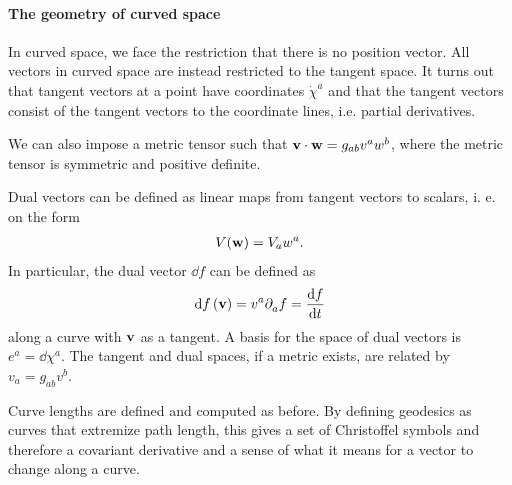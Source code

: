 \paragraph{The geometry of curved space}
In curved space, we face the restriction that there is no position vector. All vectors in curved space are instead restricted to the tangent space. It turns out that tangent vectors at a point have coordinates $\dot{\chi}^{a}$ and that the tangent vectors consist of the tangent vectors to the coordinate lines, i.e. partial derivatives.

We can also impose a metric tensor such that $\vb{v}\cdot\vb{w} = g_{ab}v^{a}w^{b}$, where the metric tensor is symmetric and positive definite.

Dual vectors can be defined as linear maps from tangent vectors to scalars, i. e. on the form
\begin{align*}
	V(\vb{w}) = V_{a}w^{a}.
\end{align*}
In particular, the dual vector $\dd{f}$ can be defined as
\begin{align*}
	\dd{f}(\vb{v}) = v^{a}\partial^{}_{a}f = \dv{f}{t}
\end{align*}
along a curve with $\vb{v}$ as a tangent. A basis for the space of dual vectors is $e^{a} = \dd{\chi^{a}}$. The tangent and dual spaces, if a metric exists, are related by $v_{a} = g_{ab}v^{b}$.

Curve lengths are defined and computed as before. By defining geodesics as curves that extremize path length, this gives a set of Christoffel symbols and therefore a covariant derivative and a sense of what it means for a vector to change along a curve.